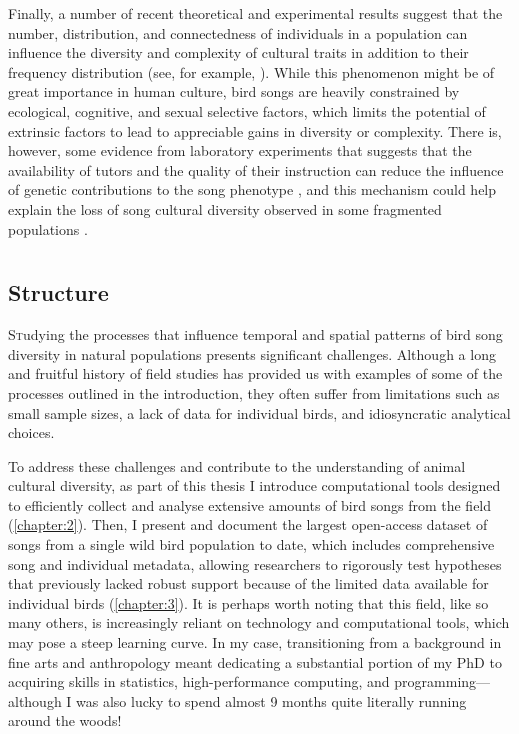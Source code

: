 Finally, a number of recent theoretical and experimental results suggest that the number, distribution, and connectedness of individuals in a population can influence the diversity and complexity of cultural traits in addition to their frequency distribution (see, for example, \cite{creanza2017,derex2018,derex2016,kempe2014}). While this phenomenon might be of great importance in human culture, bird songs are heavily constrained by ecological, cognitive, and sexual selective factors, which limits the potential of extrinsic factors to lead to appreciable gains in diversity or complexity. There is, however, some evidence from laboratory experiments that suggests that the availability of tutors and the quality of their instruction can reduce the influence of genetic contributions to the song phenotype \autocite{mets2017,mets2019}, and this mechanism could help explain the loss of song cultural diversity observed in some fragmented populations \autocite{hart2018,paxton2019}.

{\let\clearpage\relax\chapter*{}}

\section{Structure}
\lettrine[lines=2,slope=0pt, nindent=5pt]Studying the processes that influence temporal and spatial patterns of bird song diversity in natural populations presents significant challenges. Although a long and fruitful history of field studies has provided us with examples of some of the processes outlined in the introduction, they often suffer from limitations such as small sample sizes, a lack of data for individual birds, and idiosyncratic analytical choices.

To address these challenges and contribute to the understanding of animal cultural diversity, as part of this thesis I introduce computational tools designed to efficiently collect and analyse extensive amounts of bird songs from the field (\autoref{chapter:2}). Then, I present and document the largest open-access dataset of songs from a single wild bird population to date, which includes comprehensive song and individual metadata, allowing researchers to rigorously test hypotheses that previously lacked robust support because of the limited data available for individual birds (\autoref{chapter:3}). It is perhaps worth noting that this field, like so many others, is increasingly reliant on technology and computational tools, which may pose a steep learning curve. In my case, transitioning from a background in fine arts and anthropology meant dedicating a substantial portion of my PhD to acquiring skills in statistics, high-performance computing, and programming---although I was also lucky to spend almost 9 months quite literally running around the woods!

